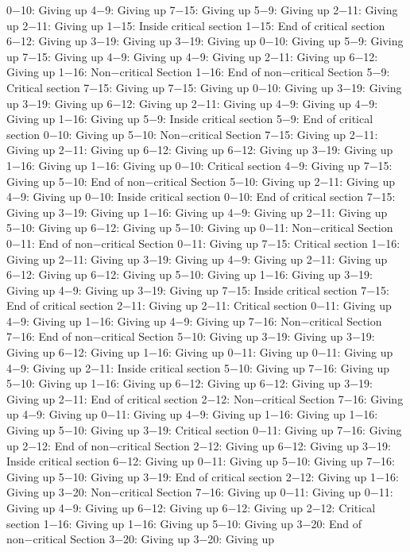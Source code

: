 0−10: Giving up
4−9: Giving up
7−15: Giving up
5−9: Giving up
2−11: Giving up
2−11: Giving up
1−15: Inside critical section
1−15: End of critical section
6−12: Giving up
3−19: Giving up
3−19: Giving up
0−10: Giving up
5−9: Giving up
7−15: Giving up
4−9: Giving up
4−9: Giving up
2−11: Giving up
6−12: Giving up
1−16: Non−critical Section
1−16: End of non−critical Section
5−9: Critical section
7−15: Giving up
7−15: Giving up
0−10: Giving up
3−19: Giving up
3−19: Giving up
6−12: Giving up
2−11: Giving up
4−9: Giving up
4−9: Giving up
1−16: Giving up
5−9: Inside critical section
5−9: End of critical section
0−10: Giving up
5−10: Non−critical Section
7−15: Giving up
2−11: Giving up
2−11: Giving up
6−12: Giving up
6−12: Giving up
3−19: Giving up
1−16: Giving up
1−16: Giving up
0−10: Critical section
4−9: Giving up
7−15: Giving up
5−10: End of non−critical Section
5−10: Giving up
2−11: Giving up
4−9: Giving up
0−10: Inside critical section
0−10: End of critical section
7−15: Giving up
3−19: Giving up
1−16: Giving up
4−9: Giving up
2−11: Giving up
5−10: Giving up
6−12: Giving up
5−10: Giving up
0−11: Non−critical Section
0−11: End of non−critical Section
0−11: Giving up
7−15: Critical section
1−16: Giving up
2−11: Giving up
3−19: Giving up
4−9: Giving up
2−11: Giving up
6−12: Giving up
6−12: Giving up
5−10: Giving up
1−16: Giving up
3−19: Giving up
4−9: Giving up
3−19: Giving up
7−15: Inside critical section
7−15: End of critical section
2−11: Giving up
2−11: Critical section
0−11: Giving up
4−9: Giving up
1−16: Giving up
4−9: Giving up
7−16: Non−critical Section
7−16: End of non−critical Section
5−10: Giving up
3−19: Giving up
3−19: Giving up
6−12: Giving up
1−16: Giving up
0−11: Giving up
0−11: Giving up
4−9: Giving up
2−11: Inside critical section
5−10: Giving up
7−16: Giving up
5−10: Giving up
1−16: Giving up
6−12: Giving up
6−12: Giving up
3−19: Giving up
2−11: End of critical section
2−12: Non−critical Section
7−16: Giving up
4−9: Giving up
0−11: Giving up
4−9: Giving up
1−16: Giving up
1−16: Giving up
5−10: Giving up
3−19: Critical section
0−11: Giving up
7−16: Giving up
2−12: End of non−critical Section
2−12: Giving up
6−12: Giving up
3−19: Inside critical section
6−12: Giving up
0−11: Giving up
5−10: Giving up
7−16: Giving up
5−10: Giving up
3−19: End of critical section
2−12: Giving up
1−16: Giving up
3−20: Non−critical Section
7−16: Giving up
0−11: Giving up
0−11: Giving up
4−9: Giving up
6−12: Giving up
6−12: Giving up
2−12: Critical section
1−16: Giving up
1−16: Giving up
5−10: Giving up
3−20: End of non−critical Section
3−20: Giving up
3−20: Giving up
